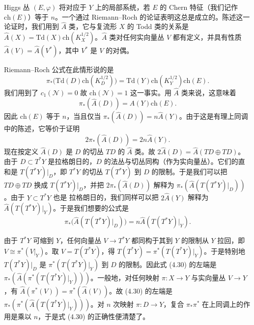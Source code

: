 \documentclass[11pt,a4paper]{article}
\begin{document}
Higgs 丛 $(E,\varphi)$ 将对应于 $Y$ 上的局部系统，若 $E$ 的 Chern 特征（我们记作 $\mathrm{ch}(E)$）等于 $n$。一个通过 Riemann--Roch 的论证表明这总是成立的。陈述这一论证时，我们用到 $\widehat{A}$ 类，它与复流形 $X$ 的 Todd 类的关系是 $\widehat{A}(X)=\mathrm{Td}(X)\mathrm{ch}(K_X^{1/2})$。$\widehat{A}$ 类对任何实向量丛 $V$ 都有定义，并具有性质 $\widehat{A}(V)=\widehat{A}(V^*)$，其中 $V^*$ 是 $V$ 的对偶。


Riemann--Roch 公式在此情形说的是
\begin{equation}\tag{4.27}
\pi_*\bigl(\mathrm{Td}(D)\mathrm{ch}(K_D^{1/2})\bigr)=\mathrm{Td}(Y)\mathrm{ch}(K_Y^{1/2})\mathrm{ch}(E).
\end{equation}
我们用到了 $c_1(\mathcal{N})=0$ 故 $\mathrm{ch}(\mathcal{N})=1$ 这一事实。用 $\widehat{A}$ 类来说，这意味着
\begin{equation}\tag{4.28}
\pi_*(\widehat{A}(D))=\widehat{A}(Y)\mathrm{ch}(E).
\end{equation}
因此 $\mathrm{ch}(E)$ 等于 $n$，当且仅当 $\pi_*(\widehat{A}(D))=n\widehat{A}(Y)$。由于这是有理上同调中的陈述，它等价于证明
\begin{equation}\tag{4.29}
2\pi_*(\widehat{A}(D))=2n\widehat{A}(Y).
\end{equation}
现在按定义 $\widehat{A}(D)$ 是 $D$ 的切丛 $TD$ 的 $\widehat{A}$ 类。故 $2\widehat{A}(D)=\widehat{A}(TD\oplus TD)$。由于 $D\subset T^*Y$ 是拉格朗日的，$D$ 的法丛与切丛同构（作为实向量丛）。它们的直和是 $T(T^*Y)|_D$，即 $T^*Y$ 的切丛 $T(T^*Y)$ 到 $D$ 的限制。于是我们可以把 $TD\oplus TD$ 换成 $T(T^*Y)|_D$，并把 $2\pi_*(\widehat{A}(D))$ 解释为 $\pi_*(\widehat{A}(T(T^*Y)|_D))$。由于 $Y\subset T^*Y$ 也是
拉格朗日的，我们同样可以把 $2\widehat{A}(Y)$ 解释为 $\widehat{A}(T(T^*Y)|_Y)$。于是我们想要的公式是
\begin{equation}\tag{4.30}
\pi_*\bigl(\widehat{A}(T(T^*Y)|_D)\bigr)=n\widehat{A}(T(T^*Y)|_Y).
\end{equation}

由于 $T^*Y$ 可缩到 $Y$，任何向量丛 $V\to T^*Y$ 都同构于其到 $Y$ 的限制从 $Y$ 拉回，即 $V\cong\pi^*(V|_Y)$。取 $V=T(T^*Y)$，得 $T(T^*Y)=\pi^*(T(T^*Y)|_Y)$。于是特别地 $T(T^*Y)|_D$ 是 $\pi^*(T(T^*Y)|_Y)$ 到 $D$ 的限制。因此式 (4.30) 的左端是 $\pi_*(\widehat{A}(\pi^*(T(T^*Y)|_Y)))$。一般地，对任何映射 $\pi:X\to Y$ 与实向量丛 $V\to Y$，有 $\widehat{A}(\pi^*(V))=\pi^*(\widehat{A}(V))$。故 (4.30) 的左端是 $\pi_*(\pi^*(\widehat{A}(T(T^*Y)|_Y)))$。对 $n$ 次映射 $\pi:D\to Y$，复合 $\pi_*\pi^*$ 在上同调上的作用是乘以 $n$，于是式 (4.30) 的正确性便清楚了。
\end{document}
